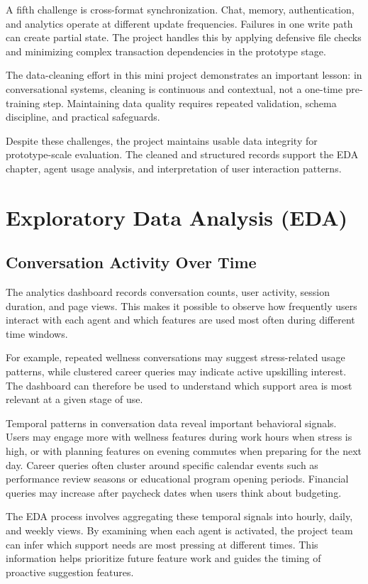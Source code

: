 \documentclass[oneside,a4paper,12pt]{report}
\begin{document}
A fifth challenge is cross-format synchronization. Chat, memory, authentication, and analytics operate at different update frequencies. Failures in one write path can create partial state. The project handles this by applying defensive file checks and minimizing complex transaction dependencies in the prototype stage.

The data-cleaning effort in this mini project demonstrates an important lesson: in conversational systems, cleaning is continuous and contextual, not a one-time pre-training step. Maintaining data quality requires repeated validation, schema discipline, and practical safeguards.

Despite these challenges, the project maintains usable data integrity for prototype-scale evaluation. The cleaned and structured records support the EDA chapter, agent usage analysis, and interpretation of user interaction patterns.

\chapter{Exploratory Data Analysis (EDA)}
\section{Conversation Activity Over Time}
The analytics dashboard records conversation counts, user activity, session duration, and page views. This makes it possible to observe how frequently users interact with each agent and which features are used most often during different time windows.

For example, repeated wellness conversations may suggest stress-related usage patterns, while clustered career queries may indicate active upskilling interest. The dashboard can therefore be used to understand which support area is most relevant at a given stage of use.

Temporal patterns in conversation data reveal important behavioral signals. Users may engage more with wellness features during work hours when stress is high, or with planning features on evening commutes when preparing for the next day. Career queries often cluster around specific calendar events such as performance review seasons or educational program opening periods. Financial queries may increase after paycheck dates when users think about budgeting.

The EDA process involves aggregating these temporal signals into hourly, daily, and weekly views. By examining when each agent is activated, the project team can infer which support needs are most pressing at different times. This information helps prioritize future feature work and guides the timing of proactive suggestion features.
\end{document}
